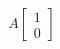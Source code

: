 \documentclass[preview]{standalone}
\begin{document}
\begin{align*}
A\begin{bmatrix} 1 \\ 0 \end{bmatrix}
\end{align*}
\end{document}
